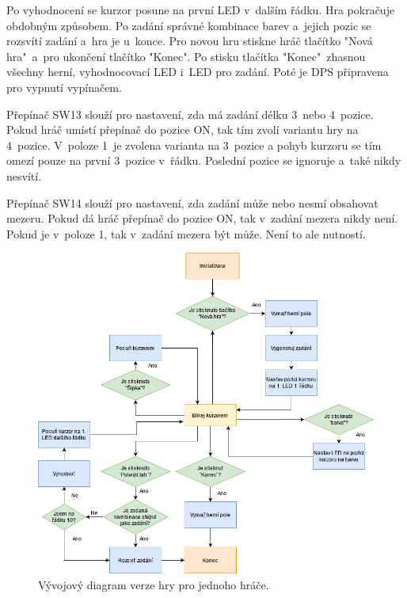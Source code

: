 Po vyhodnocení se kurzor posune na první LED v~dalším řádku. Hra pokračuje obdobným způsobem.
Po zadání správné kombinace barev a~jejich pozic se rozsvítí zadání a~hra je u~konce. Pro novou hru stiskne hráč tlačítko
"Nová hra"\  a~pro ukončení tlačítko "Konec".
Po stisku tlačítka "Konec"\  zhasnou všechny herní, vyhodnocovací LED i~LED pro zadání. Poté je DPS připravena pro vypnutí
vypínačem.

Přepínač SW13 slouží pro nastavení, zda má zadání délku 3~nebo 4~pozice. Pokud hráč umístí přepínač do pozice ON, tak tím 
zvolí variantu hry na 4~pozice. V~poloze 1~je zvolena varianta na 3~pozice a pohyb kurzoru se tím omezí pouze na první 3~pozice 
v~řádku. Poslední pozice se ignoruje a~také nikdy nesvítí.

Přepínač SW14 slouží pro nastavení, zda zadání může nebo nesmí obsahovat mezeru. Pokud dá hráč přepínač do pozice ON, 
tak v~zadání mezera nikdy není. Pokud je v~poloze 1, tak v~zadání mezera být může. Není to ale nutností. 

\begin{figure}[!h]
    \begin{center}
        \includegraphics[scale=0.55]{obrazky/vyvojovy_diagram_1_hrac.png}
    \end{center}
    \caption[Vývojový diagram verze hry pro jednoho hráče]{Vývojový diagram verze hry pro jednoho hráče.}
    \end{figure}

